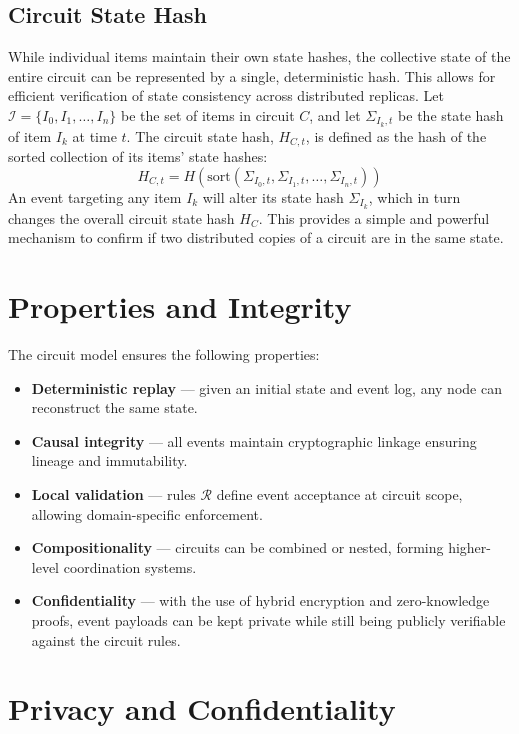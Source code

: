 \documentclass{article}
\begin{document}
\subsection{Circuit State Hash}
While individual items maintain their own state hashes, the collective state of the entire circuit can be represented by a single, deterministic hash. This allows for efficient verification of state consistency across distributed replicas. Let $\mathcal{I} = \{I_0, I_1, \dots, I_n\}$ be the set of items in circuit $C$, and let $\Sigma_{I_k, t}$ be the state hash of item $I_k$ at time $t$. The circuit state hash, $H_{C,t}$, is defined as the hash of the sorted collection of its items' state hashes:
\begin{equation}
H_{C,t} = H(\text{sort}(\Sigma_{I_0, t}, \Sigma_{I_1, t}, \dots, \Sigma_{I_n, t}))
\end{equation}
An event targeting any item $I_k$ will alter its state hash $\Sigma_{I_k}$, which in turn changes the overall circuit state hash $H_C$. This provides a simple and powerful mechanism to confirm if two distributed copies of a circuit are in the same state.

\section{Properties and Integrity}

The circuit model ensures the following properties:
\begin{itemize}
    \item \textbf{Deterministic replay} — given an initial state and event log, any node can reconstruct the same state.
    \item \textbf{Causal integrity} — all events maintain cryptographic linkage ensuring lineage and immutability.
    \item \textbf{Local validation} — rules $\mathcal{R}$ define event acceptance at circuit scope, allowing domain-specific enforcement.
    \item \textbf{Compositionality} — circuits can be combined or nested, forming higher-level coordination systems.
    \item \textbf{Confidentiality} — with the use of hybrid encryption and zero-knowledge proofs, event payloads can be kept private while still being publicly verifiable against the circuit rules.
\end{itemize}

\section{Privacy and Confidentiality}
\end{document}
